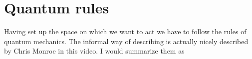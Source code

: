 \section{Quantum rules}
Having set up the space on which we want to act we have to follow the rules of quantum mechanics. The informal way of describing is actually nicely described by Chris Monroe in this video. I would summarize them as 